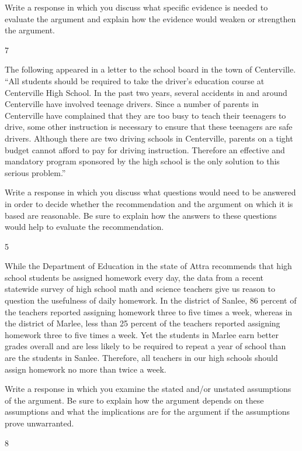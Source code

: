 \documentclass[]{article}
\begin{document}
Write a response in which you discuss what specific evidence is needed
to evaluate the argument and explain how the evidence would weaken or
strengthen the argument.

7

The following appeared in a letter to the school board in the town of
Centerville. ``All students should be required to take the driver's
education course at Centerville High School. In the past two years,
several accidents in and around Centerville have involved teenage
drivers. Since a number of parents in Centerville have complained that
they are too busy to teach their teenagers to drive, some other
instruction is necessary to ensure that these teenagers are safe
drivers. Although there are two driving schools in Centerville, parents
on a tight budget cannot afford to pay for driving instruction.
Therefore an effective and mandatory program sponsored by the high
school is the only solution to this serious problem.''

Write a response in which you discuss what questions would need to be
answered in order to decide whether the recommendation and the argument
on which it is based are reasonable. Be sure to explain how the answers
to these questions would help to evaluate the recommendation.

5

While the Department of Education in the state of Attra recommends that
high school students be assigned homework every day, the data from a
recent statewide survey of high school math and science teachers give us
reason to question the usefulness of daily homework. In the district of
Sanlee, 86 percent of the teachers reported assigning homework three to
five times a week, whereas in the district of Marlee, less than 25
percent of the teachers reported assigning homework three to five times
a week. Yet the students in Marlee earn better grades overall and are
less likely to be required to repeat a year of school than are the
students in Sanlee. Therefore, all teachers in our high schools should
assign homework no more than twice a week.

Write a response in which you examine the stated and/or unstated
assumptions of the argument. Be sure to explain how the argument depends
on these assumptions and what the implications are for the argument if
the assumptions prove unwarranted.

8
\end{document}
